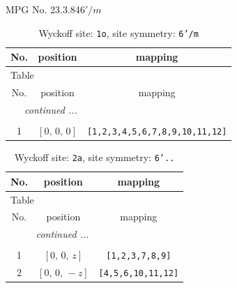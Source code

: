 \documentclass[fleqn,8pt]{jsarticle}
\begin{document}
\setcounter{MaxMatrixCols}{32}

\renewcommand{\tablename}{Table~}
\renewcommand{\figurename}{Figure~}
\begin{center}
\LARGE
MPG No. 23.3.84\quad$6'/m$
\end{center}
\renewcommand{\arraystretch}{1.2}
\begin{longtable}{ccc}
\caption{Wyckoff site: {\tt 1o}, site symmetry: {\tt 6'/m}}
 \\
 \hline \hline
No. & position & mapping \\ \hline \endfirsthead

\multicolumn{2}{l}{\tablename\ \thetable{}} \\
 \hline \hline
No. & position & mapping \\ \hline \endhead

 \hline \hline
\multicolumn{2}{r}{\footnotesize\it continued ...} \\ \endfoot

 \hline \hline
\multicolumn{2}{r}{} \\ \endlastfoot

1 & $\left[ 0,\, 0,\, 0 \right]$ & {\tt [1,2,3,4,5,6,7,8,9,10,11,12]} \\
\end{longtable}
\renewcommand{\arraystretch}{1.2}
\begin{longtable}{ccc}
\caption{Wyckoff site: {\tt 2a}, site symmetry: {\tt 6'..}}
 \\
 \hline \hline
No. & position & mapping \\ \hline \endfirsthead

\multicolumn{2}{l}{\tablename\ \thetable{}} \\
 \hline \hline
No. & position & mapping \\ \hline \endhead

 \hline \hline
\multicolumn{2}{r}{\footnotesize\it continued ...} \\ \endfoot

 \hline \hline
\multicolumn{2}{r}{} \\ \endlastfoot

1 & $\left[ 0,\, 0,\, z \right]$ & {\tt [1,2,3,7,8,9]} \\ \hline
2 & $\left[ 0,\, 0,\, - z \right]$ & {\tt [4,5,6,10,11,12]} \\
\end{longtable}
\renewcommand{\arraystretch}{1.2}
\end{document}
